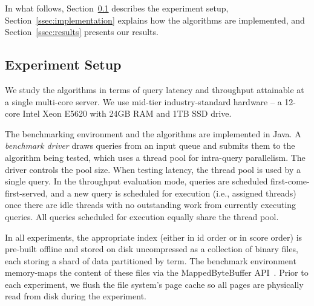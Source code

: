 {

In what follows, Section~\ref{ssec:setup} describes the experiment setup, 
Section~\ref{ssec:implementation} explains how the algorithms are 
implemented, and Section~\ref{ssec:results} presents our results.


\subsection{Experiment Setup}
\label{ssec:setup}

We study the algorithms in terms of query latency and throughput attainable at a single multi-core server. 
We use mid-tier industry-standard hardware -- a 12-core Intel Xeon E5620 with 24GB RAM and 1TB SSD drive. 

The benchmarking environment and the algorithms  are implemented in Java. 
A  \emph{benchmark driver} draws queries from an input queue and submits them to the algorithm being tested, which
uses a thread pool for intra-query parallelism. 
The driver controls the pool size. %
When testing latency, the thread pool is used by a single query. 
In the throughput evaluation mode, queries are scheduled first-come-first-served, 
and a new query is scheduled for execution (i.e., assigned threads) 
once  there are idle threads with no outstanding work from currently executing queries.
All queries scheduled for execution equally share the thread pool.

In all experiments, the appropriate index (either in id order or in score order)
is pre-built offline and stored on disk uncompressed as a collection of binary files, 
each storing a shard of data partitioned by term.  The benchmark environment memory-maps the content 
of these files via the MappedByteBuffer API~\cite{java-bytebuffer}.
Prior to each experiment, we flush the file system's page cache so all pages are physically read from disk during the experiment.


}
